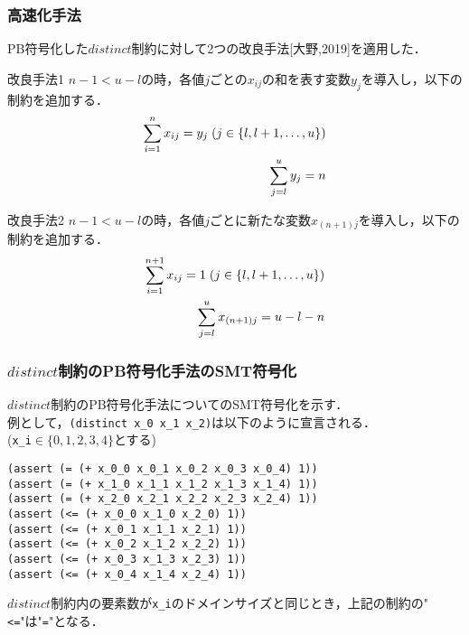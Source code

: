 \documentclass [dvipdfmx,11pt]{beamer}
\newcommand{\distinct}{$distinct$}
\begin{document}

\begin{frame}\footnotesize
    \frametitle{高速化手法}
    PB符号化した\distinct 制約に対して2つの改良手法[大野,2019]を適用した．
    \begin{exampleblock}{改良手法1}
        $n-1 < u-l$の時，各値$j$ごとの$x_{ij}$の和を表す変数$y_{j}$を導入し，以下の制約を追加する．
        \vspace{-3mm}
        \begin{eqnarray}
            \sum_{i=1}^{n} x_{ij}=y_j \; (j \in \{l,l+1, \ldots,u\})\\
            \vspace{-3mm}
            \sum_{j=l}^{u} y_j = n
        \end{eqnarray}
    \end{exampleblock}
    \vspace{-3mm}
    \begin{exampleblock}{改良手法2}
        $n-1 < u-l$の時，各値$j$ごとに新たな変数$x_{(n+1)j}$を導入し，以下の制約を追加する．
        \vspace{-3mm}
        \begin{eqnarray}
            \sum_{i=1}^{n+1} x_{ij}=1 \; (j \in \{l,l+1, \ldots,u\})\\
            \vspace{-3mm}
            \sum_{j=l}^{u} x_{(n+1)j} = u-l-n
        \end{eqnarray}
    \end{exampleblock}
\end{frame}

\begin{frame}[fragile]
    \frametitle{\distinct 制約のPB符号化手法のSMT符号化}
    \distinct 制約のPB符号化手法についてのSMT符号化を示す．\\
    例として，\verb|(distinct x_0 x_1 x_2)|は以下のように宣言される．\\
    (\verb|x_i|$\in \{0,1,2,3,4\}$とする)
    \begin{exampleblock}{}\scriptsize
\begin{verbatim}
(assert (= (+ x_0_0 x_0_1 x_0_2 x_0_3 x_0_4) 1))
(assert (= (+ x_1_0 x_1_1 x_1_2 x_1_3 x_1_4) 1))
(assert (= (+ x_2_0 x_2_1 x_2_2 x_2_3 x_2_4) 1))
(assert (<= (+ x_0_0 x_1_0 x_2_0) 1))
(assert (<= (+ x_0_1 x_1_1 x_2_1) 1))
(assert (<= (+ x_0_2 x_1_2 x_2_2) 1))
(assert (<= (+ x_0_3 x_1_3 x_2_3) 1))
(assert (<= (+ x_0_4 x_1_4 x_2_4) 1))
\end{verbatim}
    \end{exampleblock}
    \distinct 制約内の要素数が\verb|x_i|のドメインサイズと同じとき，上記の制約の"\verb|<=|"は"\verb|=|"となる．
\end{frame}
\end{document}
